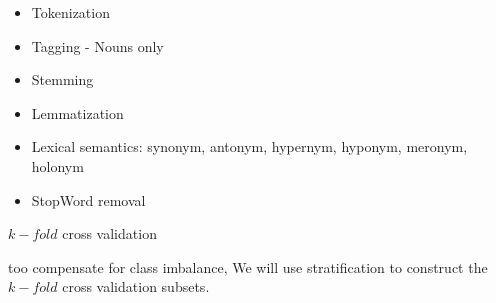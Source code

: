 \documentclass[10pt, a4paper, twocolumn]{article} %
\begin{document}
\begin{itemize}
	\item Tokenization
	\item Tagging - Nouns only
	\item Stemming
	\item Lemmatization
	\item Lexical semantics: synonym, antonym, hypernym, hyponym, meronym, holonym
	\item StopWord removal
\end{itemize}

$k-fold$ cross validation

too compensate for class imbalance, We will use stratification to construct the $k-fold$ cross validation subsets\citep{Kohavi_1995_1137, Sechidis2011}.





\end{document}
